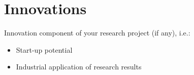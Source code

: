 \chapter*{Innovations}

Innovation component of your research project (if any), i.e.:
        \begin{itemize}
            \item Start-up potential 
            \item Industrial application of research results
        \end{itemize}